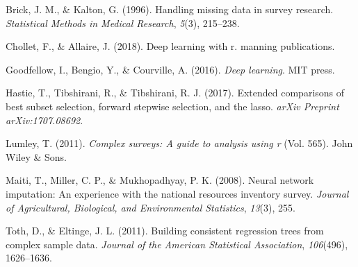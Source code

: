 \documentclass[12pt,twoside]{reedthesis}
\begin{document}
\hypertarget{ref-brick1996handling}{}
Brick, J. M., \& Kalton, G. (1996). Handling missing data in survey
research. \emph{Statistical Methods in Medical Research}, \emph{5}(3),
215--238.

\hypertarget{ref-chollet2018deep}{}
Chollet, F., \& Allaire, J. (2018). Deep learning with r. manning
publications.

\hypertarget{ref-goodfellow2016deep}{}
Goodfellow, I., Bengio, Y., \& Courville, A. (2016). \emph{Deep
learning}. MIT press.

\hypertarget{ref-hastie2017extended}{}
Hastie, T., Tibshirani, R., \& Tibshirani, R. J. (2017). Extended
comparisons of best subset selection, forward stepwise selection, and
the lasso. \emph{arXiv Preprint arXiv:1707.08692}.

\hypertarget{ref-lumley2011complex}{}
Lumley, T. (2011). \emph{Complex surveys: A guide to analysis using r}
(Vol. 565). John Wiley \& Sons.

\hypertarget{ref-maiti2008neural}{}
Maiti, T., Miller, C. P., \& Mukhopadhyay, P. K. (2008). Neural network
imputation: An experience with the national resources inventory survey.
\emph{Journal of Agricultural, Biological, and Environmental
Statistics}, \emph{13}(3), 255.

\hypertarget{ref-toth2011building}{}
Toth, D., \& Eltinge, J. L. (2011). Building consistent regression trees
from complex sample data. \emph{Journal of the American Statistical
Association}, \emph{106}(496), 1626--1636.


\end{document}
